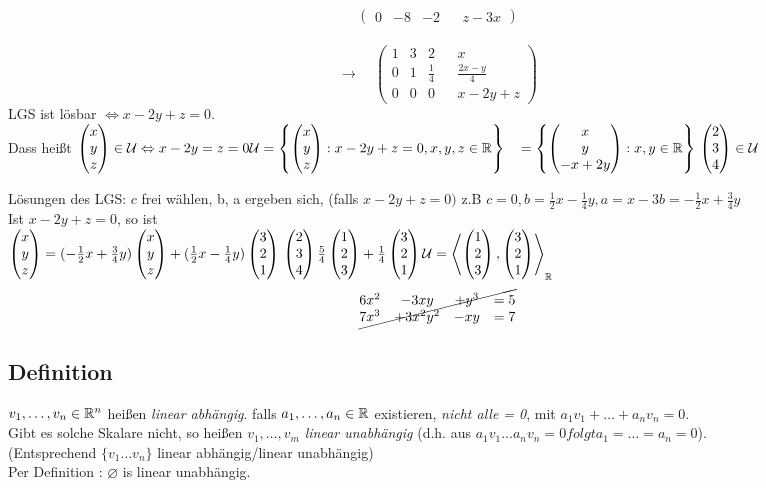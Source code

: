 \begin{enumerate}[a)]
\[\begin{pmatrix}
0&-8&-2&&z-3x
\end{pmatrix}   \]\\
\[\to\quad\begin{pmatrix}
1&3&2&&x\\
0&1&\frac14&&\frac{2x-y}4\\
0&0&0&&x-2y+z
\end{pmatrix} \]
LGS ist lösbar $\Leftrightarrow x-2y+z=0$.\\
Dass hei\ss t $\vektor{x}{y}{z} \in \U \Leftrightarrow x -2y = z =0\\
\U = \left\{ \vektor{x}{y}{z} : x-2y+z=0,x,y,z\in\R \right\}\\
\phantom{\U}= \left\{ \vektor{x}{y}{-x+2y} : x,y\in\R \right\}\\
\vektor{2}{3}{4}\in\U$
\end{enumerate}
Lösungen des LGS: $c$ frei wählen, b, a ergeben sich, (falls $x-2y + z = 0)$ z.B $c = 0, b = \frac12x-\frac14y, a = x-3b = -\frac12x + \frac34y$\\
Ist $\mathit{x-2y+z=0}$, so ist\\ $\begin{pmatrix} x\\y\\z \end{pmatrix} = (-\frac12x+\frac34y)\begin{pmatrix} x\\y\\z \end{pmatrix}+ (\frac12x - \frac14y)\begin{pmatrix} 3\\2\\1 \end{pmatrix}\\
\begin{pmatrix} 2\\3\\4 \end{pmatrix}\frac54\begin{pmatrix} 1\\2\\3 \end{pmatrix}+\frac14\begin{pmatrix} 3\\2\\1 \end{pmatrix}\\
\mathcal{U}= \left\langle\begin{pmatrix} 1\\2\\3 \end{pmatrix}, \begin{pmatrix} 3\\2\\1 \end{pmatrix} \right\rangle_{\mathbb{R}}$
\[\cancel{\begin{matrix}
6x^2&- 3xy&+y^3 &=5\\
7x^3&+ 3x^2y^2&-xy&=7
\end{matrix}} \]
\setcounter{subsection}{8}
\subsection{Definition}\label{sec:0.9}
$v_1,\ldots,v_n \in \mathbb{R}^n$ hei\ss en \emph{linear abhängig}. falls
$a_1,\ldots,a_n \in \mathbb{R}$ existieren, \emph{nicht alle = 0}, mit $a_1v_1 + \ldots +a_nv_n = 0$.\\
Gibt es solche Skalare nicht, so heißen $v_1,\ldots,v_m$ \emph{linear unabhängig} (d.h. aus $a_1v_1\ldots a_nv_n = 0 folgt a_1 = \ldots = a_n = 0$).\\
(Entsprechend $\{ v_1\ldots v_n \}$ linear abhängig/linear unabhängig)\\
Per Definition : $\varnothing$ is linear unabhängig.\\
